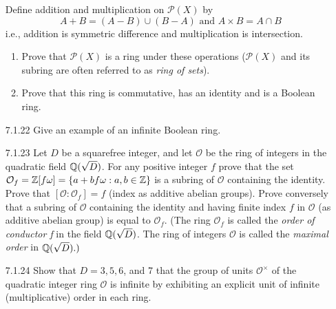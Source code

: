 \begin{enumerate}
                  Define addition and multiplication on $\mathcal{P}(X)$ by
                  $$A + B = (A - B) \cup (B - A) \text{ and }
                    A \times B = A \cap B$$
                  i.e., addition is symmetric difference and multiplication is
                  intersection.
                  \begin{enumerate}
                     \item Prove that $\mathcal{P}(X)$ is a ring under these
                           operations ($\mathcal{P}(X)$ and its subring are
                           often referred to as \textit{ring of sets}).
                     \item Prove that this ring is commutative, has an identity
                           and is a Boolean ring.
                  \end{enumerate}
   \item[7.1.22]  Give an example of an infinite Boolean ring.
   \item[7.1.23]  Let $D$ be a squarefree integer, and let $\mathcal{O}$ be the
                  ring of integers in the quadratic field $\mathbb{Q}(\sqrt{D})$. For 
                  any positive integer $f$ prove that the set
                  $\mathcal{O}_f = \mathbb{Z}[f\omega] = \{a + bf\omega : a, b \in \mathbb{Z}\}$
                  is a subring of $\mathcal{O}$ containing the identity. Prove
                  that $[\mathcal{O} : \mathcal{O}_f] = f$ (index as additive
                  abelian groups). Prove conversely that a subring of
                  $\mathcal{O}$ containing the identity and having finite index
                  $f$ in $\mathcal{O}$ (as additive abelian group) is equal to
                  $\mathcal{O}_f$. (The ring $\mathcal{O}_f$ is called the
                  \textit{order of conductor f} in the field $\mathbb{Q}(\sqrt{D})$. The
                  ring of integers $\mathcal{O}$ is called the
                  \textit{maximal order} in $\mathbb{Q}(\sqrt{D}).)$
   \item[7.1.24]  Show that $D = 3, 5, 6$, and 7 that the group of units
                  $\mathcal{O}^\times$ of the quadratic integer ring
                  $\mathcal{O}$  is infinite by exhibiting an explicit unit of
                  infinite (multiplicative) order in each ring.

\end{enumerate}
